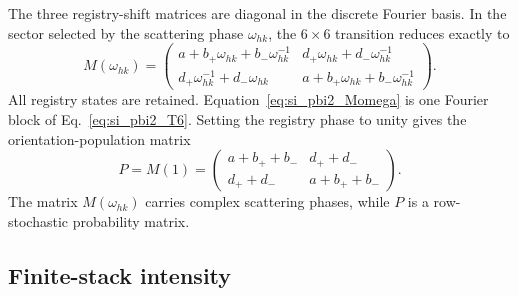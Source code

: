The three registry-shift matrices are diagonal in the discrete Fourier basis.
In the sector selected by the scattering phase $\omega_{hk}$, the $6\times6$
transition reduces exactly to
\begin{equation}
 M(\omega_{hk})=
 \begin{pmatrix}
 a+b_+\omega_{hk}+b_-\omega_{hk}^{-1} & d_+\omega_{hk}+d_-\omega_{hk}^{-1}\\
 d_+\omega_{hk}^{-1}+d_-\omega_{hk} & a+b_+\omega_{hk}+b_-\omega_{hk}^{-1}
 \end{pmatrix}.
 \label{eq:si_pbi2_Momega}
\end{equation}
All registry states are retained. Equation~\eqref{eq:si_pbi2_Momega} is one Fourier
block of Eq.~\eqref{eq:si_pbi2_T6}.  Setting the registry phase to unity gives
the orientation-population matrix
\begin{equation}
 P=M(1)=
 \begin{pmatrix}
 a+b_++b_- & d_++d_-\\
 d_++d_- & a+b_++b_-
 \end{pmatrix}.
 \label{eq:si_pbi2_P}
\end{equation}
The matrix $M(\omega_{hk})$ carries complex scattering phases, while $P$ is a row-stochastic probability matrix.

\subsection{Finite-stack intensity}

